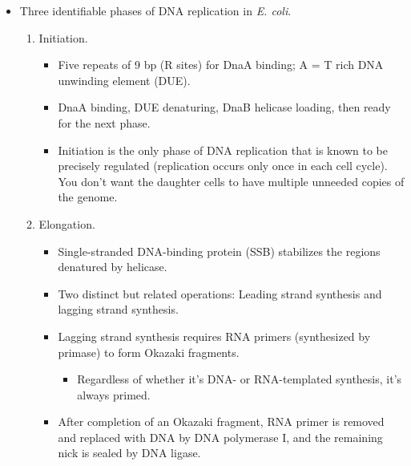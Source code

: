 \documentclass[../notes.tex]{subfiles}
\begin{document}
\begin{itemize}
\begin{itemize}
    \end{itemize}
    \item Three identifiable phases of DNA replication in \emph{E. coli}.
    \begin{enumerate}
        \item Initiation.
        \begin{itemize}
            \item Five repeats of 9 bp (R sites) for DnaA binding; A = T rich DNA unwinding element (DUE).
            \item DnaA binding, DUE denaturing, DnaB helicase loading, then ready for the next phase.
            \item Initiation is the only phase of DNA replication that is known to be precisely regulated (replication occurs only once in each cell cycle). You don't want the daughter cells to have multiple unneeded copies of the genome.
        \end{itemize}
        \item Elongation.
        \begin{itemize}
            \item Single-stranded DNA-binding protein (SSB) stabilizes the regions denatured by helicase.
            \item Two distinct but related operations: Leading strand synthesis and lagging strand synthesis.
            \item Lagging strand synthesis requires RNA primers (synthesized by primase) to form Okazaki fragments.
            \begin{itemize}
                \item Regardless of whether it's DNA- or RNA-templated synthesis, it's always primed.
            \end{itemize}
            \item After completion of an Okazaki fragment, RNA primer is removed and replaced with DNA by DNA polymerase I, and the remaining nick is sealed by DNA ligase.
        \end{itemize}

\end{enumerate}
\end{itemize}
\end{document}
